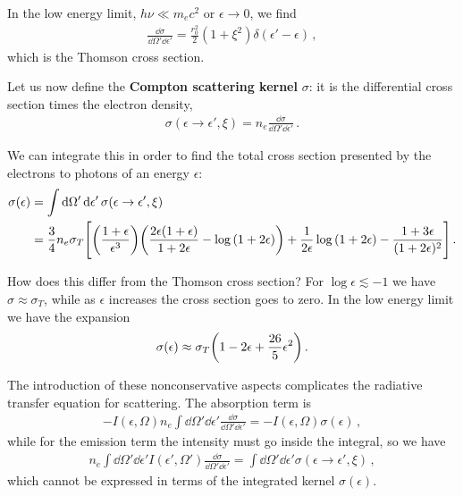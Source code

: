 \documentclass[main.tex]{subfiles}
\begin{document}
In the low energy limit, \(h \nu \ll m_e c^2 \) or \(\epsilon \to 0\), we find 
%
\begin{align}
\frac{ \dd{\sigma }}{ \dd{\Omega }' \dd{\epsilon }'} 
=
\frac{r_0^2}{2} (1 + \xi^2) \delta (\epsilon ' - \epsilon )
\,,
\end{align}
%
which is the Thomson cross section. 

Let us now define the \textbf{Compton scattering kernel} \(\sigma \): it is the differential cross section times the electron density,
%
\begin{align}
\sigma (\epsilon \to \epsilon ', \xi ) = n_e \frac{ \dd{\sigma }}{ \dd{\Omega }' \dd{\epsilon }'}
\,.
\end{align}

We can integrate this in order to find the total cross section presented by the electrons to photons of an energy \(\epsilon \): 
%
\begin{align}
\sigma (\epsilon ) &= \int \dd{\Omega '} \dd{\epsilon '} \sigma (\epsilon \to \epsilon ', \xi ) \\
&= \frac{3}{4} n_e \sigma_{T} \qty[ \qty(\frac{1 + \epsilon }{\epsilon^3}) 
\qty(\frac{2 \epsilon (1 + \epsilon )}{1 + 2 \epsilon }- \log \qty(1 + 2 \epsilon ))
+ 
\frac{1}{2 \epsilon } \log \qty(1 + 2 \epsilon )
- 
\frac{1 + 3 \epsilon }{(1 + 2 \epsilon )^2}
]
\,.
\end{align}

How does this differ from the Thomson cross section? For \(\log \epsilon \lesssim -1 \) we have \(\sigma \approx \sigma_T\), while as \(\epsilon \) increases the cross section goes to zero. 
In the low energy limit we have the expansion 
%
\begin{align}
\sigma (\epsilon )\approx \sigma_T \qty(1 -2 \epsilon + \frac{26}{5} \epsilon^2)
\,.
\end{align}

The introduction of these nonconservative aspects complicates the radiative transfer equation for scattering.
The absorption term is 
%
\begin{align}
- I (\epsilon , \Omega ) n_e \int \dd{\Omega }' \dd{\epsilon }' \frac{ \dd{\sigma }}{ \dd{\Omega }' \dd{\epsilon }' } =     - I (\epsilon , \Omega  ) \sigma (\epsilon )
\,,
\end{align}
%
while for the emission term the intensity must go inside the integral, so we have 
%
\begin{align}
n_e \int \dd{\Omega }' \dd{\epsilon '} I(\epsilon ', \Omega ') \frac{ \dd{\sigma }}{ \dd{\Omega }' \dd{\epsilon }' } = \int \dd{\Omega }' \dd{\epsilon }' \sigma (\epsilon \to \epsilon ', \xi )
\,,
\end{align}
%
which cannot be expressed in terms of the integrated kernel \(\sigma (\epsilon )\). 
\end{document}
